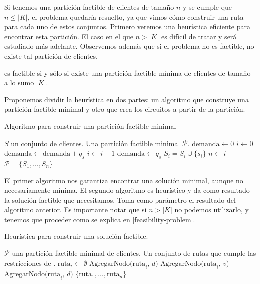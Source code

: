 Si tenemos una partición factible de clientes de tamaño $n$ y se cumple que $n \leq |K|$, el problema quedaría resuelto, ya que vimos cómo construir una ruta para cada uno de estos conjuntos. Primero veremos una heurística eficiente para encontrar esta partición. El caso en el que $n > |K|$ es difícil de tratar y será estudiado más adelante. Observemos además que si el problema no es factible, no existe tal partición de clientes.

\begin{observation}
    \label{obs:heuristic-observation}
     es factible si y sólo si existe una partición factible mínima de clientes de tamaño a lo sumo $|K|$.
\end{observation}

Proponemos dividir la heurística en dos partes: un algoritmo que construye una partición factible minimal y otro que crea los circuitos a partir de la partición.

\begin{algorithm}[H]
  \caption{Algoritmo para construir una partición factible minimal}
  \label{al:feasible_minimal_partition_algorithm}
  \begin{algorithmic}[1]
  	\Require $S$ un conjunto de clientes.
  	\Ensure Una partición factible minimal $\mathscr{P}$.
        \State $\text{demanda} \gets 0$
        \State $i \gets 0$
            \State $\text{demanda} \gets \text{demanda} + q_s$
                \State $i \gets i + 1$
                \State $\text{demanda} \gets q_s$
            \EndIf
            \State $S_i = S_i \cup \{s_i\}$
        \EndFor
        \State $n \gets i$
	\Return $\mathscr{P} = \{S_1, \dots, S_n\}$
  \end{algorithmic}
\end{algorithm}

El primer algoritmo nos garantiza encontrar una solución minimal, aunque no necesariamente mínima. El segundo algoritmo es heurístico y da como resultado la solución factible que necesitamos. Toma como parámetro el resultado del algoritmo anterior. Es importante notar que si $n > |K|$ no podemos utilizarlo, y tenemos que proceder como se explica en \ref{feasibility-problem}.

\begin{algorithm}[H]
  \caption{Heurística para construir una solución factible.}
  \label{al:feasible_solution_heuristic}
  \begin{algorithmic}[1]
  	\Require $\mathscr{P}$ una partición factible minimal de clientes.
  	\Ensure Un conjunto de rutas que cumple las restricciones de .
            \State $\text{ruta}_i \gets \emptyset$
            \State $\text{AgregarNodo(ruta}_i \text{, } d \text{)}$
                \State $\text{AgregarNodo(ruta}_i \text{, } v \text{)}$
            \EndFor
            \State $\text{AgregarNodo(ruta}_i \text{, } d \text{)}$
        \EndFor
	\Return $\{\text{ruta}_1, \dots, \text{ruta}_n\}$
  \end{algorithmic}
\end{algorithm}

